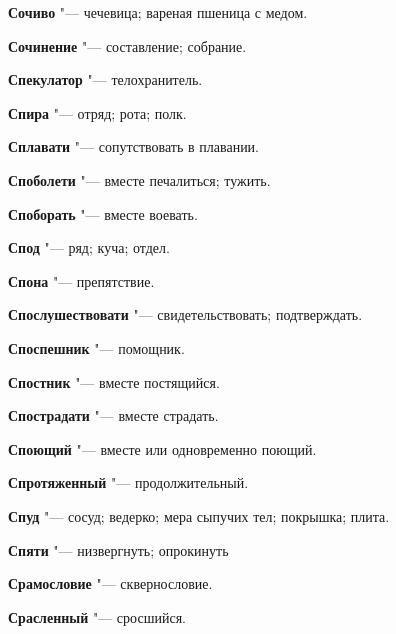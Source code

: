 \begin{mymulticols}{2}
\noindent\textbf{Сочиво} "--- чечевица; вареная пшеница с медом. 




\noindent\textbf{Сочинение} "--- составление; собрание. 




\noindent\textbf{Спекулатор} "--- телохранитель. 




\noindent\textbf{Спира} "--- отряд; рота; полк. 




\noindent\textbf{Сплавати} "--- сопутствовать в плавании. 




\noindent\textbf{Споболети} "--- вместе печалиться; тужить. 




\noindent\textbf{Споборать} "--- вместе воевать. 




\noindent\textbf{Спод} "--- ряд; куча; отдел. 




\noindent\textbf{Спона} "--- препятствие. 




\noindent\textbf{Спослушествовати} "--- свидетельствовать; подтверждать. 




\noindent\textbf{Споспешник} "--- помощник. 




\noindent\textbf{Спостник} "--- вместе постящийся. 




\noindent\textbf{Спострадати} "--- вместе страдать. 




\noindent\textbf{Споющий} "--- вместе или одновременно поющий. 




\noindent\textbf{Спротяженный} "--- продолжительный. 




\noindent\textbf{Спуд} "--- сосуд; ведерко; мера сыпучих тел; покрышка; плита. 




\noindent\textbf{Спяти} "--- низвергнуть; опрокинуть 




\noindent\textbf{Срамословие} "--- сквернословие. 




\noindent\textbf{Срасленный} "--- сросшийся. 





\end{mymulticols}
